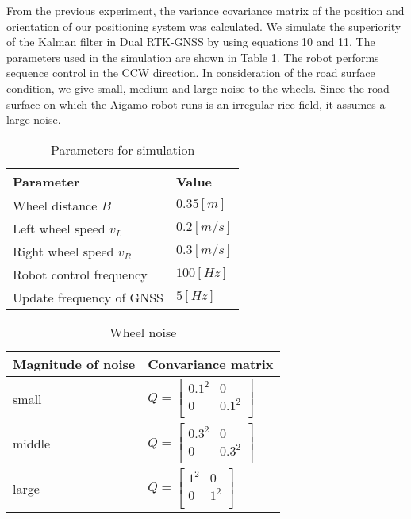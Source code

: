 \documentclass[a4paper]{article}
\begin{document}
From the previous experiment, the variance covariance matrix of the position and orientation 
of our positioning system was calculated. We simulate the superiority of the Kalman filter 
in Dual RTK-GNSS by using equations 10 and 11. The parameters used in the simulation 
are shown in Table 1. The robot performs sequence control in the CCW 
direction. In consideration of the road surface condition, we give small, medium and large noise 
to the wheels. Since the road surface on which the Aigamo robot runs is an irregular 
rice field, it assumes a large noise.


\begin{table}[H]
    \caption{Parameters for simulation}
    \label{table:table1}
    \centering
    \begin{tabular}{|l|l|}
        \hline
        Parameter & Value \\
        \hline \hline
        Wheel distance \(B\) & \(0.35[m]\) \\
        Left wheel speed \(v_L\) & \(0.2 [m/s]\) \\
        Right wheel speed \(v_R\) & \(0.3 [m/s]\) \\
        Robot control frequency & \(100 [Hz]\) \\
        Update frequency of GNSS & \(5 [Hz]\) \\
       \hline
    \end{tabular}
\end{table}

\newlength{\myheight}
\setlength{\myheight}{1.2cm}

\begin{table}[h]
    \caption{Wheel noise}
    \label{table:table2}
    \centering
    
    \begin{tabular}{|l|l|}
    \hline
    Magnitude of noise & Convariance matrix \\
    \hline \hline
    \parbox[c][\myheight][c]{0cm}{} small & $ Q =  
        \begin{bmatrix}
            0.1^2 &0 \\
            0     &0.1^2 \\ 
        \end{bmatrix}
        $ \\
    \hline
    \parbox[c][\myheight][c]{0cm}{} middle & $ Q =  
    \begin{bmatrix}
            0.3^2 &0 \\
            0     &0.3^2 \\ 
        \end{bmatrix}
        $ \\
    \hline
    \parbox[c][\myheight][c]{0cm}{} large & $ Q =  
        \begin{bmatrix}
            1^2 &0 \\
            0     &1^2 \\ 
        \end{bmatrix}
        $ \\
    \hline
    \end{tabular}
\end{table}
\end{document}
